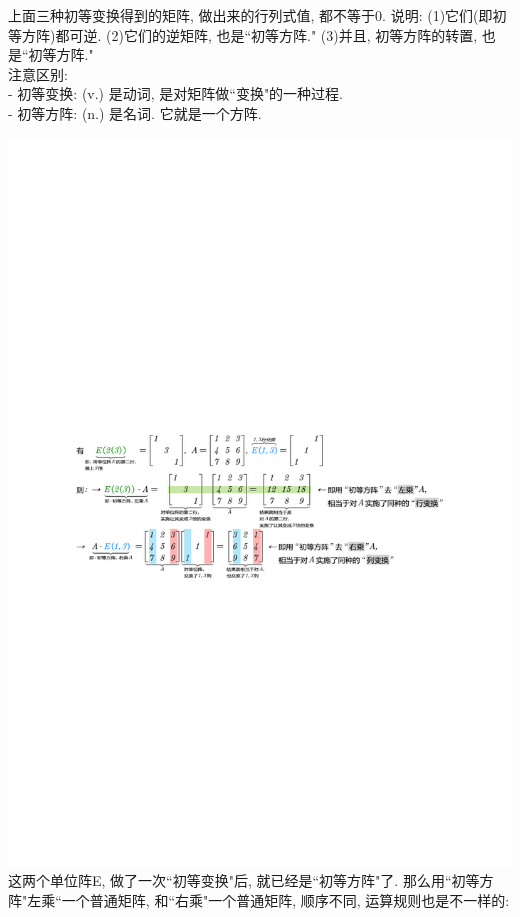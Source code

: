 \documentclass[UTF8]{ctexart}
\begin{document}
上面三种初等变换得到的矩阵, 做出来的行列式值, 都不等于0. 说明: (1)它们(即初等方阵)都可逆. (2)它们的逆矩阵, 也是``初等方阵." (3)并且, 初等方阵的转置, 也是``初等方阵." \\



注意区别:\\
- 初等变换:  (v.) 是动词, 是对矩阵做``变换"的一种过程. \\
- 初等方阵: (n.) 是名词. 它就是一个方阵.\\



\begin{myEnvSample}
\includegraphics[width=1\textwidth]{img/0036.pdf}\\

这两个单位阵E, 做了一次``初等变换"后, 就已经是``初等方阵"了. 那么用``初等方阵"左乘``一个普通矩阵, 和``右乘"一个普通矩阵, 顺序不同, 运算规则也是不一样的:\\


\end{myEnvSample}
\end{document}
